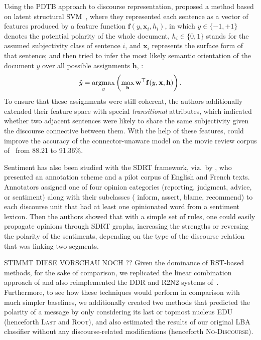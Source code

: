 Using the PDTB approach to discourse representation,  proposed a method based on latent
structural SVM~\cite{Yu:09}, where they represented each sentence as a
vector of features produced by a feature function $\mathbf{f}(y,
\mathbf{x}_i, h_i)$, in which $y\in\{-1, +1\}$ denotes the potential
polarity of the whole document, $h_i \in \{0, 1\}$ stands for the
assumed subjectivity class of sentence $i$, and $\mathbf{x}_i$
represents the surface form of that sentence; and then tried to infer
the most likely semantic orientation of the document $\hat{y}$ over
all possible assignments $\mathbf{h}$, \ie{}:
\begin{equation*}
  \hat{y} =
  \argmax_y\left(\max_{\mathbf{h}}\mathbf{w}^{\top}\mathbf{f}(y,
  \mathbf{x}, \mathbf{h})\right).
\end{equation*}
To ensure that these assignments were still coherent, the authors
additionally extended their feature space with special
\emph{transitional} attributes, which indicated whether two adjacent
sentences were likely to share the same subjectivity given the
discourse connective between them.  With the help of these features,
 could improve the accuracy of the
connector-unaware model on the movie review corpus of~
from 88.21 to 91.36\%.

Sentiment has also been studied with the SDRT framework, viz.\ by
, who presented an annotation scheme and a pilot
corpus of English and French texts. Annotators 
assigned one of four
opinion categories (reporting, judgment, advice, or sentiment) along
with their subclasses (\eg{} inform, assert, blame, recommend) to each
discourse unit that had at least one opinionated word from a sentiment
lexicon.  Then the authors showed that with a simple set of rules, one
could easily propagate opinions through SDRT graphs, increasing the
strengths or reversing the polarity of the sentiments, depending on
the type of the discourse relation that was linking two segments.


STIMMT DIESE VORSCHAU NOCH ?? Given the dominance of RST-based methods, for the sake of comparison,
we replicated the linear combination approach of  and
also reimplemented the DDR and R2N2 systems of~.
Furthermore, to see how these techniques would perform in comparison
with much simpler baselines, we additionally created two methods that
predicted the polarity of a message by only considering its last or
topmost nucleus EDU (henceforth \textsc{Last} and \textsc{Root}), and
also estimated the results of our original LBA classifier without any
discourse-related modifications (henceforth \textsc{No-Discourse}).
